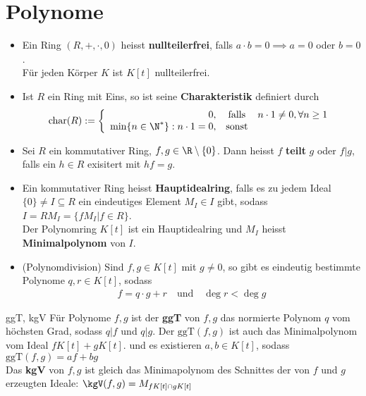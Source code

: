 \section{Polynome}
\begin{itemize}
    \item   Ein Ring $(R,+,\cdot,0)$ heisst \textbf{nullteilerfrei}, falls $a \cdot b = 0 \implies a = 0$ oder $b = 0$.\\
    Für jeden Körper $K$ ist $K[t]$ nullteilerfrei.
    \item   Ist $R$ ein Ring mit Eins, so ist seine \textbf{Charakteristik} definiert durch
    \begin{align*}
        \text{char}(R) := \left\{ \begin{array}{rcl}
            0, &\text{falls}& n \cdot 1 \neq 0, \forall n \geq 1\\
            \min\{n \in \N^*\}: n \cdot 1 = 0, &\text{sonst}
        \end{array} \right.
    \end{align*}
    \item   Sei $R$ ein kommutativer Ring, $f,g \in \R \setminus \{0\}$. Dann heisst $f$ \textbf{teilt} $g$ oder $f | g$, falls ein $h \in R$ exisitert mit $hf = g$.
    \item   Ein kommutativer Ring heisst \textbf{Hauptidealring}, falls es zu jedem Ideal $\{0\} \neq I \subseteq R$ ein eindeutiges Element $M_I \in I$ gibt, sodass $I = RM_I = \{fM_I \big\vert f \in R\}$.\\
    Der Polynomring $K[t]$ ist ein Hauptidealring und $M_I$ heisst \textbf{Minimalpolynom} von $I$.
    \item   (Polynomdivision)
    Sind $f,g \in K[t]$ mit $g \neq 0$, so gibt es eindeutig bestimmte Polynome $q,r \in K[t]$, sodass
    \begin{align*}
        f = q \cdot g + r \quad \text{und} \quad \deg r < \deg g
    \end{align*}
\end{itemize}

\begin{definition}{ggT, kgV}
    Für Polynome $f,g$ ist der \textbf{ggT} von $f,g$ das normierte Polynom $q$ vom höchsten Grad, sodass $q|f$ und $q|g$. Der $\text{ggT}(f,g)$ ist auch das Minimalpolynom vom Ideal $fK[t] + gK[t]$. und es existieren $a,b \in K[t]$, sodass $\text{ggT}(f,g) = af + bg$\\
    Das \textbf{kgV} von $f,g$ ist gleich das Minimapolynom des Schnittes der von $f$ und $g$ erzeugten Ideale: $\kgV(f,g) = M_{fK[t] \cap gK[t]}$
\end{definition}


